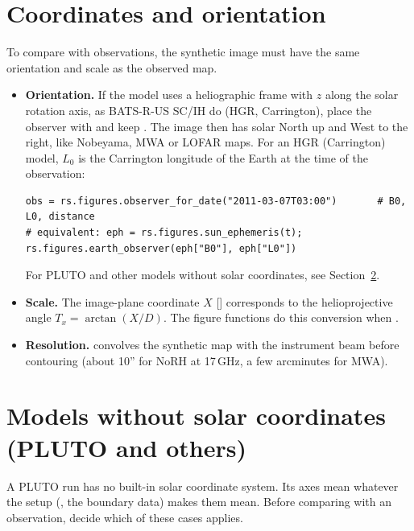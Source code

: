 \section{Coordinates and orientation}
To compare with observations, the synthetic image must have the same orientation and
scale as the observed map.
\begin{itemize}[itemsep=2pt]
\item \textbf{Orientation.} If the model uses a heliographic frame with $z$ along the
      solar rotation axis, as BATS-R-US SC/IH do (HGR, Carrington), place the observer
      with  and keep . The image then
      has solar North up and West to the right, like Nobeyama, MWA or LOFAR maps. For an
      HGR (Carrington) model, $L_0$ is the Carrington longitude of the Earth at the time
      of the observation:
\begin{lstlisting}[style=pyex]
obs = rs.figures.observer_for_date("2011-03-07T03:00")       # B0, L0, distance
# equivalent: eph = rs.figures.sun_ephemeris(t); rs.figures.earth_observer(eph["B0"], eph["L0"])
\end{lstlisting}
      For PLUTO and other models without solar coordinates, see
      Section~\ref{sec:orient}.
\item \textbf{Scale.} The image-plane coordinate $X$ [\rsun] corresponds to the
      helioprojective angle $T_x=\arctan(X/D)$. The figure functions do this conversion
      when .
\item \textbf{Resolution.}  convolves the synthetic map with
      the instrument beam before contouring (about 10'' for NoRH at 17\,GHz, a few
      arcminutes for MWA).
\end{itemize}

\section{Models without solar coordinates (PLUTO and others)}\label{sec:orient}
A PLUTO run has no built-in solar coordinate system. Its axes mean whatever the setup
(, the boundary data) makes them mean. Before comparing with an observation,
decide which of these cases applies.


